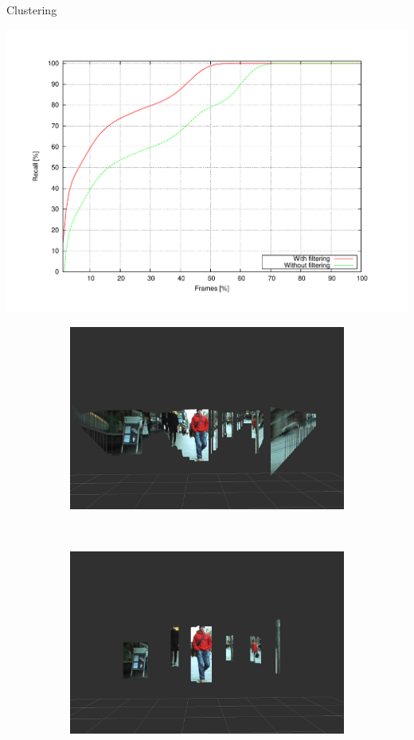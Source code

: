 \begin{frame}[plain]{Clustering}
  \begin{center}
     {
      \vspace{-0.5cm}
      \includegraphics[height=1.1\textheight]{detectionRate}
    }
     {
    \begin{figure}
      \begin{subfigure}[b]{0.5\columnwidth}
	\centering
	\includegraphics[width=\textwidth]{stixelsDetection}
	\caption*{\cite{benenson2012pedestrian}}
      \end{subfigure}%
      ~
      \begin{subfigure}[b]{0.5\columnwidth}
	\centering
	\includegraphics[width=\textwidth]{obstacleDetection}

\end{subfigure}
\end{figure}}
\end{center}
\end{frame}
